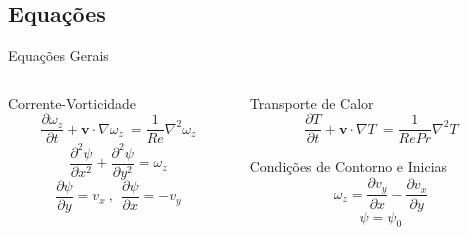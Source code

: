 \documentclass{beamer}
\begin{document}
	\subsection{Equações}
    \begin{frame}{Equações Gerais}
    	\begin{columns}			
			\begin{column}{0.5\textwidth}
			   	\begin{block}{\small{Corrente-Vorticidade}}
			   	 	\begin{equation}			   	 	
\frac{\partial \omega_z}{\partial t} + \mathbf{v} \cdot \nabla \omega_z \ = \frac{1}{Re} \nabla^2 \omega_z		
		        	\end{equation}
        	       	\begin{equation}
\frac{\partial^2 \psi}{\partial x^2} +\frac{\partial^2 \psi}{\partial y^2} = \omega_z
		        	\end{equation}  
                	\begin{equation}
\frac{\partial \psi}{\partial y} = v_x \  , \ \ \frac{\partial \psi}{\partial x} = -v_y        
        			\end{equation}        
	        	\end{block}
        	\end{column}
			\begin{column}{0.5\textwidth}
	    		\begin{block}{\small{Transporte de Calor}}
    	    	  	\begin{equation}	
\frac{\partial T}{\partial t} + \mathbf{v} \cdot \nabla T  \ = \frac{1}{Re Pr} \nabla^2 T 	 	
		 			\end{equation}
		 		\end{block}
				\begin{block}{\small{Condições de Contorno e Inicias}}
					\begin{equation}
				\omega_z = \frac{\partial v_y}{\partial x}-\frac{\partial v_x}{\partial y}
					\end{equation}
					\begin{equation}
				\psi = \psi_0
					\end{equation}					
				\end{block}	 	
			\end{column}
		\end{columns}	 	
	 \end{frame}
    
    
\end{document}
